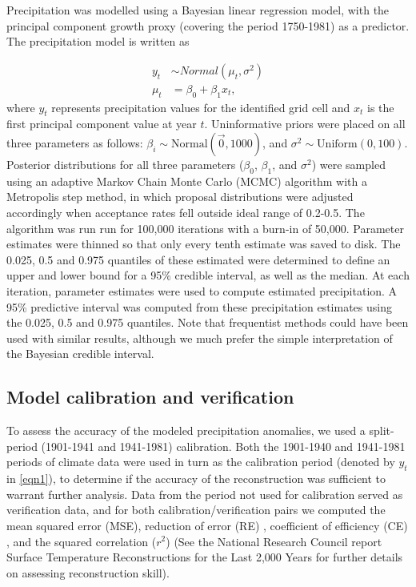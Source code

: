 Precipitation was modelled using a Bayesian linear
regression model, with the principal component growth proxy (covering the
period 1750-1981) as a predictor. The precipitation model is written
as 

\begin{align}
\label{eqn1}
y_t &\sim Normal( \mu_t, \sigma^2)\\
\mu_t &= \beta_0 + \beta_1 x_t,
\end{align}
where $y_t$ represents precipitation values for the identified grid cell and $x_t$
is the first principal component value at year $t$. Uninformative
priors were placed on all three parameters as follows: $\beta_i \sim
\text{Normal}(\vec{0},1000)$, and $\sigma^2 \sim \text{Uniform}(0,100)$.
Posterior distributions for all three parameters ($\beta_0$, $\beta_1$,
and $\sigma^2$) were sampled using an adaptive Markov Chain Monte Carlo (MCMC)
algorithm with a Metropolis step method, in which proposal distributions were adjusted 
accordingly when acceptance rates fell outside ideal range of 0.2-0.5. The algorithm was run
run for 100,000 iterations with a burn-in of 50,000. Parameter estimates were thinned so that only every
tenth estimate was saved to disk. The 0.025, 0.5 and 0.975 quantiles
of these estimated were determined to define an upper and lower bound
for a 95\% credible interval, as well as the median. At each iteration,
parameter estimates were used to compute estimated precipitation. A 95\%
predictive interval was computed from these precipitation estimates
using the 0.025, 0.5 and 0.975 quantiles. Note that frequentist methods could have been used with similar results, although we much prefer the simple interpretation of the Bayesian credible interval.

\subsection{Model calibration and verification} \label{cal_ver}

To assess the accuracy of the modeled precipitation anomalies, we used a split-period (1901-1941 and 1941-1981) calibration. Both
the 1901-1940 and 1941-1981 periods of climate data were used in turn as the
calibration period (denoted by $y_t$ in \ref{eqn1}), to determine if the accuracy of the reconstruction
was sufficient to warrant further analysis. Data from the period
not used for calibration served as verification data, and for both
calibration/verification pairs we computed the mean squared error
(MSE), reduction of error (RE) \cite{fritts1976tree}, coefficient of
efficiency (CE) \cite{cook1994spatial}, and the squared correlation
($r^2$) (See the National Research Council report Surface Temperature
Reconstructions for the Last 2,000 Years \cite{national2006surface}
for further details on assessing reconstruction skill). %

